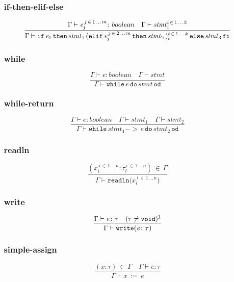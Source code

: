 \documentclass[a4paper,12pt]{article}
\newcommand\resw[1]{\mathtt{#1}}
\newcommand\mi[1]{\mathit{#1}}
\begin{document}
	\subsubsection{if-then-elif-else}
	\[
		\frac{\Gamma \vdash \mi{e}_{j}^{\, j \, \in \, 1 \, \dots \, m} \colon boolean \quad %
		\Gamma \vdash \mi{stmt}_{i}^{i \, \in \, 1 \, \dots \, 3}}%
		{%
		\Gamma \vdash  \resw{if} \, \mi{e}_{1} \, \resw{then} \, \mi{stmt}_{1}  \,
		 (\resw{elif} \, \mi{e}_{j}^{\, j \, \in \, 2 \, \dots \, m} \, \resw{then} \, \mi{stmt}_{2}\,)_{t}^{t \, \in \, 1 \, \dots \, k} \,
		  \resw{else} \, \mi{stmt}_{3} \, \resw{fi}
		}%
	\]
	\subsubsection{while}
	\[
		\frac{\Gamma \vdash \mi{e} \colon boolean \quad \Gamma \vdash \mi{stmt}}%
		{\Gamma \vdash \resw{while} \, \mi{e} \, \resw{do}\, \mi{stmt} \, \resw{od}}
	\]
	\subsubsection{while-return}
	\[
		\frac{\Gamma \vdash \mi{e} \colon boolean \quad \Gamma \vdash \mi{stmt}_{1} \quad \Gamma \vdash \mi{stmt}_{2}}%
		{\Gamma \vdash \resw{while} \, \mi{stmt}_{1}  \resw{-\!\!>}\, \mi{e} \, \resw{do}\, \mi{stmt}_{2} \, \resw{od}}
	\]
	\subsubsection{readln}
	\[
		\frac{(x_{i}^{\, i \, \in \, 1 \, \dots \, n} \colon \tau_{i}^{\, i \, \in \, 1 \, \dots \, n}) \, \in \, \Gamma}%
		{\Gamma \vdash \resw{readln(} \mi{x}_{i}^{\, i \, \in \, 1 \, \dots \, n} \resw{)}}
	\]
    \subsubsection{write}
    \[
        \frac{\Gamma \vdash \mi{e} \colon \tau \quad (\tau \neq \resw{void})\footnotemark}%
        {\Gamma \vdash \resw{write(} \mi{e} \colon \tau \resw{)}}
    \]
    \subsubsection{simple-assign}
    \[
        \frac{(\mi{x} \colon \tau) \, \in \, \Gamma \quad \Gamma \vdash \mi{e} \colon \tau}%
        {\Gamma \vdash \mi{x} \, \resw{:=} \, \mi{e}}
    \]
\end{document}
